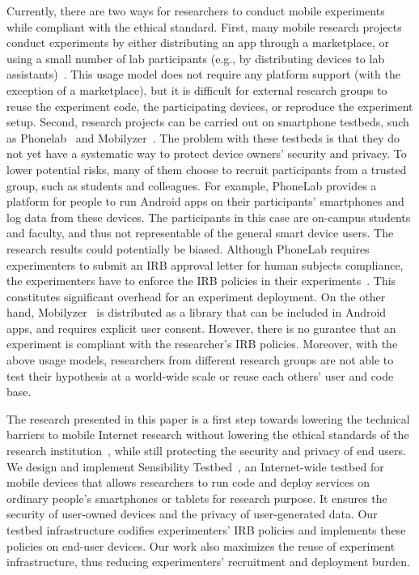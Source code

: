 Currently, there are two ways for researchers to conduct mobile 
experiments while compliant with the ethical standard. 
First, many mobile research projects conduct experiments 
by either distributing an app through a marketplace, or using a 
small number of lab participants (e.g., by distributing devices to 
lab assistants)~\cite{hao2013isleep, wang2012no, 
wang2013sensing}. This usage model does not require any 
platform support (with the exception of a marketplace), but it 
is difficult for external research groups to reuse the experiment 
code, the participating devices, or reproduce the experiment 
setup. Second, research projects can be carried out on 
smartphone testbeds, such as Phonelab~\cite{phonelab, 
nandugudi2013phonelab} and 
Mobilyzer~\cite{nikravesh2015mobilyzer}. 
The problem with these testbeds is that they do not yet 
have a systematic way to protect device owners' security and 
privacy. To lower potential risks, many of them choose to 
recruit participants from a trusted group, such as students and 
colleagues. For example, PhoneLab provides a platform for 
people to run Android apps on their participants' smartphones 
and log data from these devices. %
The participants in this case are on-campus students and faculty, 
and thus not representable of the general smart device users. 
The research results could potentially 
be biased. Although PhoneLab requires experimenters to 
submit an IRB approval letter for human subjects compliance, 
the experimenters have to enforce the IRB policies in their 
experiments~\cite{nandugudi2013phonelab}. This constitutes
significant overhead for an experiment deployment. On the other 
hand, Mobilyzer~\cite{nikravesh2015mobilyzer} is distributed 
as a library that can be included in Android apps, and requires 
explicit user consent. However, there is no gurantee that an 
experiment is compliant with the researcher's IRB policies.
Moreover, with the above usage models, researchers from 
different research groups are not able to test their hypothesis 
at a world-wide scale or reuse each others' user and code base.
					
The research presented in this paper is a first step towards lowering the technical
barriers to mobile Internet research without lowering the
ethical standards of the research institution~\cite{zevenbergen2013ethical}, while still 
protecting the security and privacy of end users. We design and implement 
Sensibility Testbed~\cite{sensibility, zhuang2014sensibility}, an 
Internet-wide testbed for mobile devices that
allows researchers to run code and deploy services on ordinary
people's smartphones or tablets for research purpose. It ensures
the security of user-owned devices and the privacy of
user-generated data. Our testbed 
infrastructure codifies experimenters' IRB policies and 
implements these policies on end-user devices. Our work also 
maximizes the reuse of experiment infrastructure, thus reducing 
experimenters' recruitment and deployment burden. 

